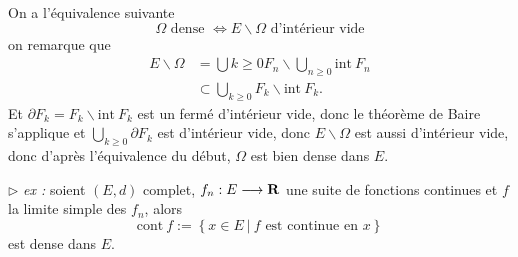 \documentclass[a4paper,11pt, twoside]{article}
\begin{document}
\begin{Proof}
  On a l'équivalence suivante 
  $$\Omega\text{ dense }\Leftrightarrow E\backslash \Omega\text{ d'intérieur vide}$$
  on remarque que 
  \begin{align*}
    E\backslash\Omega&=\bigcup{k\geqslant 0}F_n\backslash\bigcup_{n\geqslant 0}\mathrm{int}\ F_n\\
    &\subset \bigcup_{k\geqslant 0}F_k\backslash\mathrm{int}\ F_k.
  \end{align*}
  Et $\partial F_k=F_k\backslash\mathrm{int}\ F_k$ est un fermé d'intérieur vide, donc le théorème de Baire s'applique et $\bigcup_{k\geqslant 0}\partial F_k$ est d'intérieur vide, donc $E\backslash\Omega$ est aussi d'intérieur vide, donc d'après l'équivalence du début, $\Omega$ est bien dense dans $E$.
\end{Proof}

$\triangleright$\emph{ ex :} soient $(E,d)$ complet, $f_n:E\longrightarrow \mathbf R$ une suite de fonctions continues et $f$ la limite simple des $f_n$, alors 
$$\mathrm{cont}\ f:=\left\{x\in E\ |\ f\text{ est continue en }x\right\}$$
est dense dans $E$.
\end{document}
